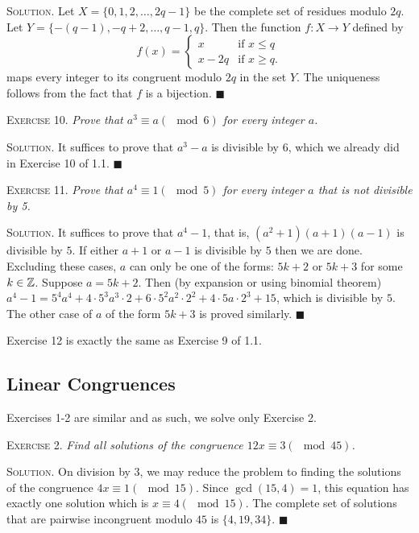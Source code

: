 \documentclass[11pt, leqno]{article}
\newcommand{\done}{\ensuremath{\blacksquare}}
\begin{document}
\textsc{Solution}. Let $X=\{0,1,2,\ldots,2q-1\}$ be the complete set of residues modulo $2q$. Let $Y=\{-(q-1),-q+2,\ldots,q-1,q\}$. Then the function $f:X\to Y$ defined by 
\begin{displaymath}
f(x) =
\begin{cases}
  x & \text{if } x \leq q \\
  x-2q & \text{if } x\geq q.
\end{cases}
\end{displaymath}
maps every integer to its congruent modulo $2q$ in the set $Y$. The uniqueness follows from the fact that $f$ is a bijection. \done

\textsc{Exercise 10}. \emph{Prove that $a^3 \equiv a (\mod 6)$ for every integer $a$.}

\textsc{Solution}. It suffices to prove that $a^3-a$ is divisible by $6$, which we already did in Exercise 10 of 1.1. \done

\textsc{Exercise 11}. \emph{Prove that $a^4\equiv 1 (\mod 5)$ for every integer $a$ that is not divisible by 5.}

\textsc{Solution}. It suffices to prove that $a^4-1$, that is, $(a^2+1)(a+1)(a-1)$ is divisible by $5$. If either $a+1$ or $a-1$ is divisible by $5$ then we are done. Excluding these cases, $a$ can only be one of the forms: $5k+2$ or $5k+3$ for some $k\in\mathbb{Z}$. Suppose $a=5k+2$. Then (by expansion or using binomial theorem) $a^4-1 = 5^4a^4 + 4\cdot 5^3a^3 \cdot 2 + 6\cdot 5^2a^2\cdot 2^2 + 4\cdot 5a\cdot 2^3 + 15$, which is divisible by $5$. The other case of $a$ of the form $5k+3$ is proved similarly. \done

Exercise 12 is exactly the same as Exercise 9 of 1.1.

\subsection{Linear Congruences}

Exercises 1-2 are similar and as such, we solve only Exercise 2.

\textsc{Exercise 2}. \emph{Find all solutions of the congruence $12x \equiv 3 (\mod 45)$.}

\textsc{Solution}. On division by $3$, we may reduce the problem to finding the solutions of the congruence $4x \equiv 1 (\mod 15)$. Since $\gcd(15,4) =1$, this equation has exactly one solution which is $x\equiv 4(\mod 15)$. The complete set of solutions that are pairwise incongruent modulo $45$ is $\{ 4, 19, 34 \}$. \done
\end{document}
